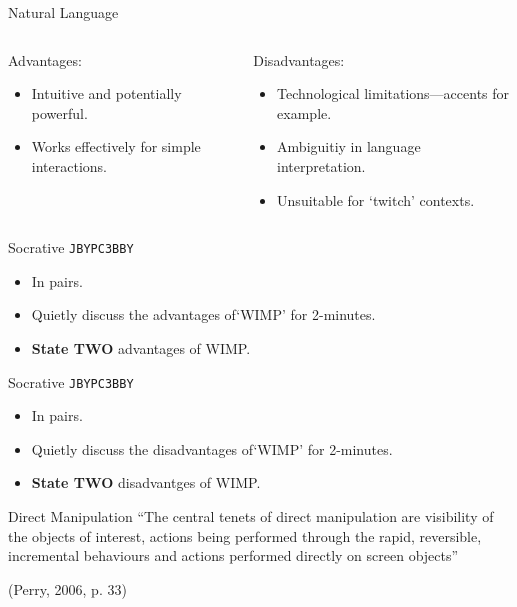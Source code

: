 \begin{frame}{Natural Language}
	\begin{columns}[onlytextwidth]
		\begin{column}{0.45\textwidth}
			Advantages:
	
			\begin{itemize}
				\item Intuitive and potentially powerful.
				\item Works effectively for simple interactions.
			\end{itemize}
		\end{column}
		\begin{column}{0.45\textwidth}
			Disadvantages:
	
			\begin{itemize}
				\item Technological limitations---accents for example.
				\item Ambiguitiy in language interpretation.
				\item Unsuitable for `twitch' contexts.
			\end{itemize}
		\end{column}
	\end{columns}	
\end{frame}

\begin{frame}[fragile]{Socrative \texttt{JBYPC3BBY}}
	\begin{itemize}
		\item In pairs.
		\item Quietly discuss the advantages of`WIMP' for 2-minutes.
		\item \textbf{State TWO} advantages of WIMP.
	\end{itemize}
\end{frame}

\begin{frame}[fragile]{Socrative \texttt{JBYPC3BBY}}
	\begin{itemize}
		\item In pairs.
		\item Quietly discuss the disadvantages of`WIMP' for 2-minutes.
		\item \textbf{State TWO} disadvantges of WIMP.
	\end{itemize}
\end{frame}

\begin{frame}{Direct Manipulation}
	``The central tenets of direct manipulation are visibility of the objects of interest,
	actions being performed through the rapid, reversible, incremental behaviours and
	actions performed directly on screen objects'' 
	
	\vspace{2ex}
	
	(Perry, 2006, p. 33)
\end{frame}

